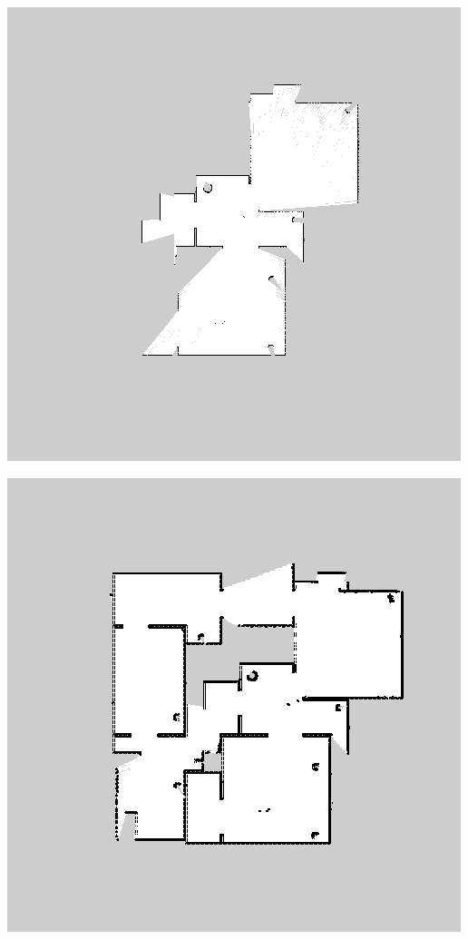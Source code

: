 \documentclass[17pt, a0paper, portrait]{tikzposter}
\begin{document}
\begin{columns}
{\begin{tikzfigure}
\begin{minipage}[t]{0.24\linewidth}
    \end{minipage}
    \begin{minipage}[t]{0.24\linewidth}
        \includegraphics[width=\linewidth]{../img/merging-with-known-initial-positions-end-robot2.png}
    \end{minipage}
    \hfill
    \begin{minipage}[t]{0.24\linewidth}
        \includegraphics[width=\linewidth]{../img/merging-with-known-initial-positions-end-merged_known.png}
    \end{minipage}
    \vspace{1.5em}
\end{tikzfigure}
} %


\end{columns}
\end{document}
